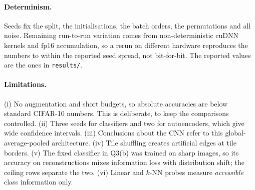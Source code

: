 \paragraph{Determinism.} Seeds fix the split, the initialisations, the batch orders, the permutations and all noise. Remaining
run-to-run variation comes from non-deterministic cuDNN kernels and fp16 accumulation, so a rerun on different hardware
reproduces the numbers to within the reported seed spread, not bit-for-bit. The reported values are the ones in
\texttt{results/}.

\paragraph{Limitations.} (i) No augmentation and short budgets, so absolute accuracies are below standard CIFAR-10 numbers.
This is deliberate, to keep the comparisons controlled. (ii) Three seeds for classifiers and two for autoencoders, which
give wide confidence intervals. (iii) Conclusions about the CNN refer to this global-average-pooled architecture.
(iv) Tile shuffling creates artificial edges at tile borders. (v) The fixed classifier in Q3(b) was trained on sharp
images, so its accuracy on reconstructions mixes information loss with distribution shift; the ceiling rows separate the two.
(vi) Linear and $k$-NN probes measure \emph{accessible} class information only.
